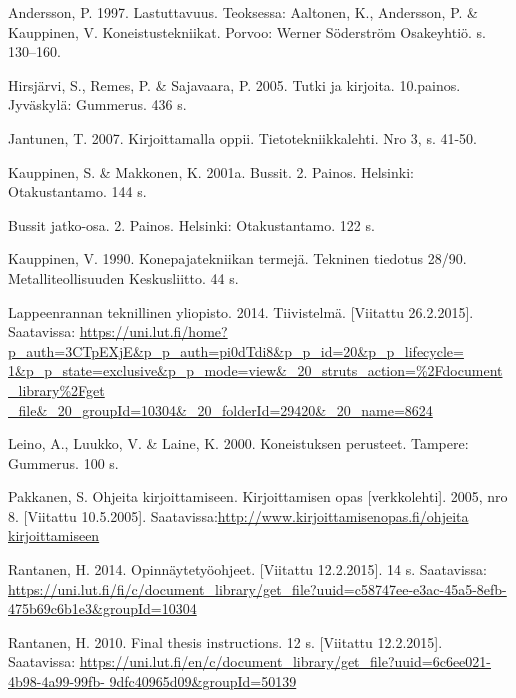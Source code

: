 \documentclass{LUT_pohja}[2016/03/09 LUT Dippa Pohja]
\begin{document}
\newpage
\begin{thebibliography}{99}
 Andersson, P. 1997. Lastuttavuus. Teoksessa: Aaltonen, K., Andersson, P. \& Kauppinen, V. Koneistustekniikat. Porvoo: Werner Söderström Osakeyhtiö. s. 130–160.

Hirsjärvi, S., Remes, P. \& Sajavaara, P. 2005. Tutki ja kirjoita. 10.painos. Jyväskylä: Gummerus. 436 s.

Jantunen, T. 2007. Kirjoittamalla oppii. Tietotekniikkalehti. Nro 3, s. 41-50.

Kauppinen, S. \& Makkonen, K. 2001a. Bussit. 2. Painos. Helsinki: Otakustantamo. 144 s.

Bussit jatko-osa. 2. Painos. Helsinki: Otakustantamo. 122 s. 

Kauppinen,  V.  1990.  Konepajatekniikan  termejä.  Tekninen  tiedotus  28/90. Metalliteollisuuden Keskusliitto. 44 s.

Lappeenrannan teknillinen yliopisto. 2014. Tiivistelmä. [Viitattu 26.2.2015]. Saatavissa:
\url{https://uni.lut.fi/home?p_auth=3CTpEXjE&p_p_auth=pi0dTdi8&p_p_id=20&p_p_lifecycle=
1&p_p_state=exclusive&p_p_mode=view&_20_struts_action=%
_file&_20_groupId=10304&_20_folderId=29420&_20_name=8624 }

Leino, A., Luukko, V. \& Laine, K. 2000. Koneistuksen perusteet. Tampere: Gummerus. 100 s.

Pakkanen, S. Ohjeita kirjoittamiseen. Kirjoittamisen opas [verkkolehti]. 2005, nro 8. [Viitattu 10.5.2005]. Saatavissa:\url{http://www.kirjoittamisenopas.fi/ohjeita kirjoittamiseen}

Rantanen, H. 2014. Opinnäytetyöohjeet.  [Viitattu  12.2.2015].  14  s.  Saatavissa: \url{https://uni.lut.fi/fi/c/document_library/get_file?uuid=c58747ee-e3ac-45a5-8efb-
475b69c6b1e3&groupId=10304}

Rantanen, H. 2010. Final thesis instructions. 12 s. [Viitattu 12.2.2015]. Saatavissa: 
\url{https://uni.lut.fi/en/c/document_library/get_file?uuid=6c6ee021-4b98-4a99-99fb-
9dfc40965d09&groupId=50139}



\end{thebibliography}
\end{document}
